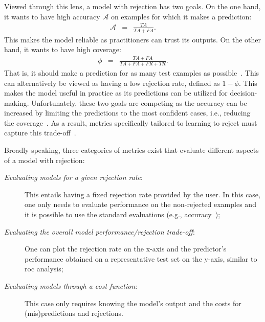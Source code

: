 Viewed through this lens, a model with rejection has two goals. On the one hand, it wants to have high accuracy $\mathcal{A}$ on examples for which it makes a prediction:
\begin{eqnarray*}
\mathcal{A} &=& \frac{TA}{TA+FA}.
\end{eqnarray*}
\noindent This makes the model reliable as practitioners can trust its outputs. On the other hand, it wants to have high coverage:
\begin{eqnarray*}
    \phi &=& \frac{TA+FA}{TA+FA+FR+TR}.
\end{eqnarray*}
\noindent That is, it should make a prediction for as many test examples as possible~\citep{DeStefano2000,El-Yaniv2010,Lei2014}. This can alternatively be viewed as having a low rejection rate, defined as $1-\phi$. 
This makes the model useful in practice as its predictions can be utilized for decision-making. Unfortunately, these two goals are competing as the accuracy can be increased by limiting the predictions to the most confident cases, i.e., reducing the coverage~\citep{Hansen1997a,Homenda2016}. As a result, metrics specifically tailored to learning to reject must capture this trade-off~\citep{Cordella}. 

Broadly speaking, three categories of metrics exist that evaluate different aspects of a model with rejection:
\begin{description}
    \item[\emph{Evaluating models for a given rejection rate}:] This entails having a fixed rejection rate provided by the user. In this case, one only needs to evaluate performance on the non-rejected examples and it is possible to use the standard evaluations (e.g., accuracy~\citep{Golfarelli1997}); 
    \item[\emph{Evaluating the overall model performance/rejection trade-off}:] One can plot the rejection rate on the x-axis and the predictor's performance obtained on a representative test set on the y-axis, similar to \gls{roc} analysis;
    \item[\emph{Evaluating models through a cost function}:]
    This case only requires knowing the model's output and the costs for (mis)predictions and rejections.
\end{description}


